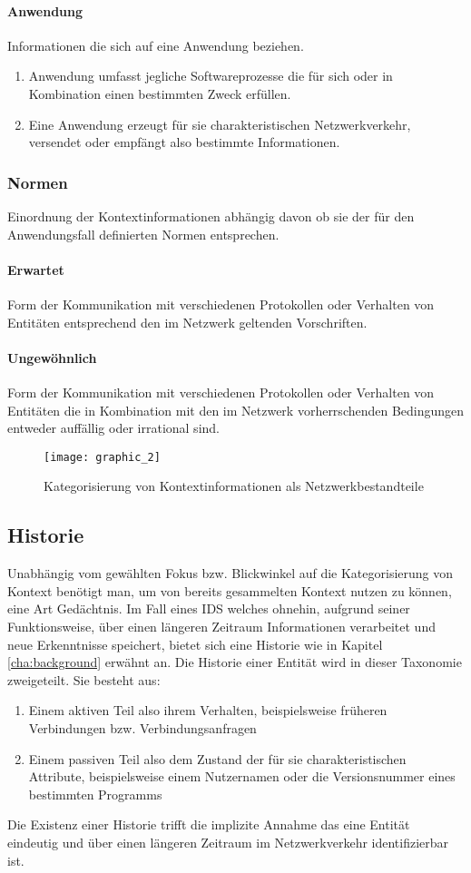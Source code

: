 \paragraph{Anwendung}
Informationen die sich auf eine Anwendung beziehen.
\begin{enumerate}
\item{Anwendung umfasst jegliche Softwareprozesse die für sich oder in Kombination einen bestimmten Zweck erfüllen.}
\item{Eine Anwendung erzeugt für sie charakteristischen Netzwerkverkehr, versendet oder empfängt also bestimmte Informationen.}
\end{enumerate}
\subsubsection{Normen}
Einordnung der Kontextinformationen abhängig davon ob sie der für den Anwendungsfall definierten Normen entsprechen.
\paragraph{Erwartet}
Form der Kommunikation mit verschiedenen Protokollen oder Verhalten von Entitäten entsprechend den im Netzwerk geltenden Vorschriften.
\paragraph{Ungewöhnlich}
Form der Kommunikation mit verschiedenen Protokollen oder Verhalten von Entitäten die in Kombination mit den im Netzwerk vorherrschenden Bedingungen entweder auffällig oder irrational sind.
\newpage
\begin{figure}[H]
\centering
\texttt{[image: graphic\_2]}
\caption{Kategorisierung von Kontextinformationen als Netzwerkbestandteile}
\end{figure}
\subsection{Historie}
Unabhängig vom gewählten Fokus bzw. Blickwinkel auf die Kategorisierung von Kontext benötigt man, um von bereits gesammelten Kontext nutzen zu können, eine Art Gedächtnis. Im Fall eines IDS welches ohnehin, aufgrund seiner Funktionsweise, über einen längeren Zeitraum Informationen verarbeitet und neue Erkenntnisse speichert, bietet sich eine Historie wie in Kapitel \ref{cha:background} erwähnt an.
Die Historie einer Entität wird in dieser Taxonomie zweigeteilt. Sie besteht aus:
\begin{enumerate}
\item{Einem aktiven Teil also ihrem Verhalten, beispielsweise früheren Verbindungen bzw. Verbindungsanfragen}
\item{Einem passiven Teil also dem Zustand der für sie charakteristischen Attribute, beispielsweise einem Nutzernamen oder die Versionsnummer eines bestimmten Programms}
\end{enumerate}
Die Existenz einer Historie trifft die implizite Annahme das eine Entität eindeutig und über einen längeren Zeitraum im Netzwerkverkehr identifizierbar ist.
